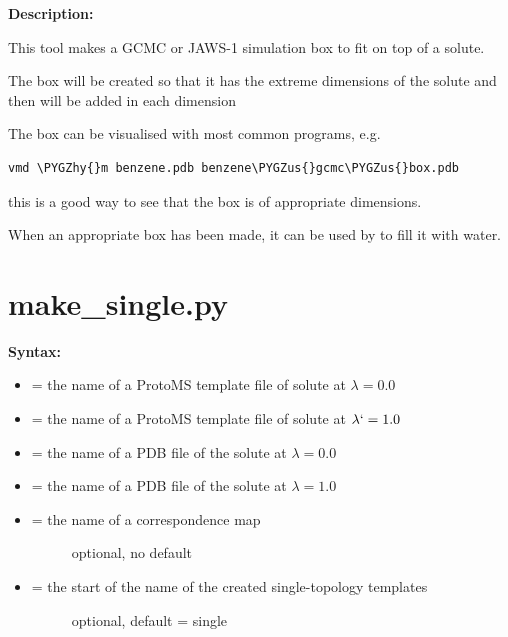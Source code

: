 \documentclass[letterpaper,10pt,english]{sphinxmanual}
\def\PYGZus{\char`\_}
\def\PYGZhy{\char`\-}
\begin{document}
\textbf{Description:}

This tool makes a GCMC or JAWS-1 simulation box to fit on top of a solute.

The box will be created so that it has the extreme dimensions of the solute and then  will be added in each dimension

The box can be visualised with most common programs, e.g.

\begin{Verbatim}[commandchars=\\\{\}]
vmd \PYGZhy{}m benzene.pdb benzene\PYGZus{}gcmc\PYGZus{}box.pdb
\end{Verbatim}

this is a good way to see that the box is of appropriate dimensions.

When an appropriate box has been made, it can be used by  to fill it with water.


\section{make\_single.py}
\label{tools:make-single-py}
\textbf{Syntax:}

\begin{itemize}
\item {} 
 = the name of a ProtoMS template file of solute at \(\lambda=0.0\)

\item {} 
 = the name of a ProtoMS template file of solute at \(\lambda`=1.0\)

\item {} 
 = the name of a PDB file of the solute at \(\lambda=0.0\)

\item {} 
 = the name of a PDB file of the solute at \(\lambda=1.0\)

\item {} \begin{description}
\item[{ = the name of a correspondence map}] \leavevmode
optional, no default

\end{description}

\item {} \begin{description}
\item[{ = the start of the name of the created single-topology templates}] \leavevmode
optional, default = single

\end{description}

\end{itemize}
\end{document}
